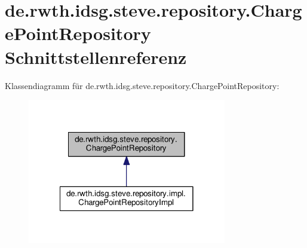 \hypertarget{interfacede_1_1rwth_1_1idsg_1_1steve_1_1repository_1_1_charge_point_repository}{\section{de.\-rwth.\-idsg.\-steve.\-repository.\-Charge\-Point\-Repository Schnittstellenreferenz}
\label{interfacede_1_1rwth_1_1idsg_1_1steve_1_1repository_1_1_charge_point_repository}
}


Klassendiagramm für de.\-rwth.\-idsg.\-steve.\-repository.\-Charge\-Point\-Repository\-:\nopagebreak
\begin{figure}[H]
\begin{center}
\leavevmode
\includegraphics[width=246pt]{interfacede_1_1rwth_1_1idsg_1_1steve_1_1repository_1_1_charge_point_repository__inherit__graph}
\end{center}
\end{figure}
